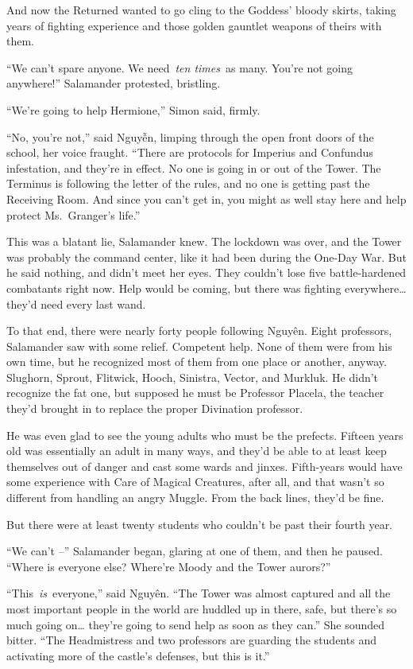And now the Returned wanted to go cling to the Goddess' bloody skirts,
taking years of fighting experience and those golden gauntlet weapons of
theirs with them.

``We can't spare anyone. We need~\emph{ten times}~as many. You're not
going anywhere!'' Salamander protested, bristling.

``We're going to help Hermione,'' Simon said, firmly.

``No, you're not,'' said Nguyễn, limping through the open front doors of
the school, her voice fraught. ``There are protocols for Imperius and
Confundus infestation, and they're in effect. No one is going in or out
of the Tower. The Terminus is following the letter of the rules, and no
one is getting past the Receiving Room. And since you can't get in, you
might as well stay here and help protect Ms.~Granger's life.''

This was a blatant lie, Salamander knew. The lockdown was over, and the
Tower was probably the command center, like it had been during the
One-Day War. But he said nothing, and didn't meet her eyes. They
couldn't lose five battle-hardened combatants right now. Help would be
coming, but there was fighting everywhere\ldots{} they'd need every last
wand.

To that end, there were nearly forty people following
Nguy\makebox[0pt][l]{\raisebox{0.5ex}{˜}}ên. Eight professors,
Salamander saw with some relief. Competent help. None of them were from
his own time, but he recognized most of them from one place or another,
anyway. Slughorn, Sprout, Flitwick, Hooch, Sinistra, Vector, and
Murkluk. He didn't recognize the fat one, but supposed he must be
Professor Placela, the teacher they'd brought in to replace the proper
Divination professor.

He was even glad to see the young adults who must be the prefects.
Fifteen years old was essentially an adult in many ways, and they'd be
able to at least keep themselves out of danger and cast some wards and
jinxes. Fifth-years would have some experience with Care of Magical
Creatures, after all, and that wasn't so different from handling an
angry Muggle. From the back lines, they'd be fine.

But there were at least twenty students who couldn't be past their
fourth year.

``We can't --'' Salamander began, glaring at one of them, and then he
paused. ``Where is everyone else? Where're Moody and the Tower aurors?''

``This~\emph{is}~everyone,'' said
Nguy\makebox[0pt][l]{\raisebox{0.5ex}{˜}}ên. ``The Tower was almost
captured and all the most important people in the world are huddled up
in there, safe, but there's so much going on\ldots{} they're going to
send help as soon as they can.'' She sounded bitter. ``The Headmistress
and two professors are guarding the students and activating more of the
castle's defenses, but this is it.''

